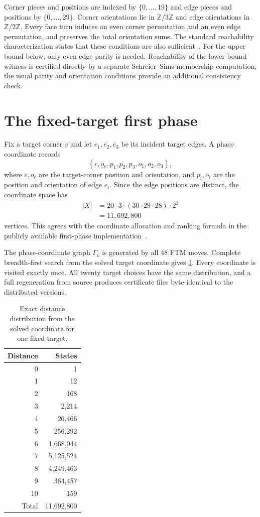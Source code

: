 \documentclass[11pt]{article}
\theoremstyle{definition}
\begin{document}
Corner pieces and positions are indexed by $\{0,\ldots,19\}$ and edge pieces and positions by $\{0,\ldots,29\}$.  Corner orientations lie in $\mathbb Z/3\mathbb Z$ and edge orientations in $\mathbb Z/2\mathbb Z$.  Every face turn induces an even corner permutation and an even edge permutation, and preserves the total orientation sums.  The standard reachability characterization states that these conditions are also sufficient~\cite[Theorems 3.8 and 3.12]{xu2018}.  For the upper bound below, only even edge parity is needed.  Reachability of the lower-bound witness is certified directly by a separate Schreier--Sims membership computation; the usual parity and orientation conditions provide an additional consistency check.

\section{The fixed-target first phase}

Fix a target corner $v$ and let $e_1,e_2,e_3$ be its incident target edges.  A phase coordinate records
\[
(c,o_c,p_1,p_2,p_3,o_1,o_2,o_3),
\]
where $c,o_c$ are the target-corner position and orientation, and $p_i,o_i$ are the position and orientation of edge $e_i$.  Since the edge positions are distinct, the coordinate space has
\begin{align*}
|X|&=20\cdot3\cdot(30\cdot29\cdot28)\cdot2^3\\
&=11{,}692{,}800
\end{align*}
vertices.  This agrees with the coordinate allocation and ranking formula in the publicly available first-phase implementation~\cite{botz-12gen}.

The phase-coordinate graph $\Gamma_v$ is generated by all $48$ FTM moves.  Complete breadth-first search from the solved target coordinate gives \cref{tab:distribution}.  Every coordinate is visited exactly once.  All twenty target choices have the same distribution, and a full regeneration from source produces certificate files byte-identical to the distributed versions.

\begin{table}[ht]
\centering
\caption{Exact distance distribution from the solved coordinate for one fixed target.}
\label{tab:distribution}
\begin{tabular}{@{}rr@{}}
\toprule
Distance & States\\
\midrule
0 & 1\\
1 & 12\\
2 & 168\\
3 & 2,214\\
4 & 26,466\\
5 & 256,292\\
6 & 1,668,044\\
7 & 5,125,524\\
8 & 4,249,463\\
9 & 364,457\\
10 & 159\\
\midrule
Total & 11,692,800\\
\bottomrule
\end{tabular}
\end{table}
\end{document}
